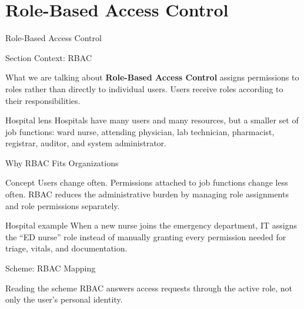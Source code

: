 \documentclass[presentation]{beamer}
\newcommand{\sectiontitleframe}[1]{
\begin{frame}[plain,c]
\begin{center}
{\usebeamerfont{title}\usebeamercolor[fg]{title}#1}
\end{center}
\end{frame}
}
\begin{document}
\section{Role-Based Access Control}
\sectiontitleframe{Role-Based Access Control}

\begin{frame}[c]{Section Context: RBAC}
\begin{block}{What we are talking about}
\textbf{Role-Based Access Control} assigns permissions to roles rather than directly to individual
users. Users receive roles according to their responsibilities.
\end{block}

\begin{exampleblock}{Hospital lens}
Hospitals have many users and many resources, but a smaller set of job functions: ward nurse,
attending physician, lab technician, pharmacist, registrar, auditor, and system administrator.
\end{exampleblock}
\end{frame}

\begin{frame}[c]{Why RBAC Fits Organizations}
\begin{block}{Concept}
Users change often. Permissions attached to job functions change less often. RBAC reduces the
administrative burden by managing role assignments and role permissions separately.
\end{block}

\begin{exampleblock}{Hospital example}
When a new nurse joins the emergency department, IT assigns the ``ED nurse'' role instead of
manually granting every permission needed for triage, vitals, and documentation.
\end{exampleblock}
\end{frame}

\begin{frame}[c]{Scheme: RBAC Mapping}
\begin{center}
\end{center}

\begin{block}{Reading the scheme}
RBAC answers access requests through the active role, not only the user's personal identity.
\end{block}
\end{frame}
\end{document}
